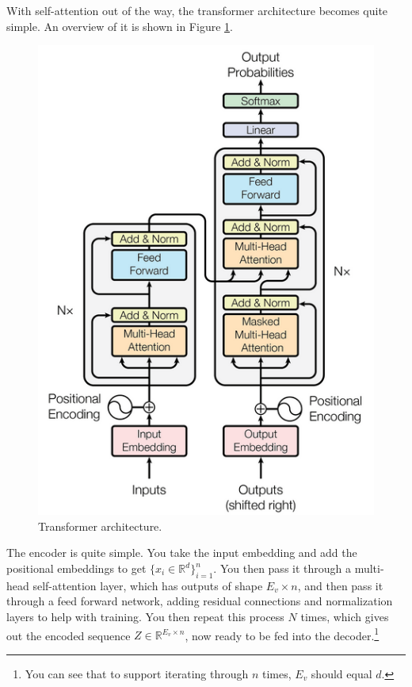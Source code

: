 \documentclass{article}
\begin{document}
    With self-attention out of the way, the transformer architecture becomes quite simple. An overview of it is shown in Figure \ref{fig:transformer}. 

    \begin{figure}[H]
      \centering 
      \includegraphics[scale=1.0]{img/10_Attention/transformer.png}
      \caption{Transformer architecture. } 
      \label{fig:transformer}
    \end{figure}

    The encoder is quite simple. You take the input embedding and add the positional embeddings to get $\{x_i \in \mathbb{R}^d\}_{i=1}^n$. You then pass it through a multi-head self-attention layer, which has outputs of shape $E_v \times n$, and then pass it through a feed forward network, adding residual connections and normalization layers to help with training. You then repeat this process $N$ times, which gives out the encoded sequence $Z \in \mathbb{R}^{E_v \times n}$, now ready to be fed into the decoder.\footnote{You can see that to support iterating through $n$ times, $E_v$ should equal $d$.}
\end{document}
